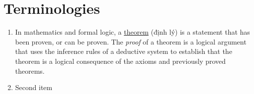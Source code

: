 \chapter{Terminologies}

\begin{enumerate}
  \item In mathematics and formal logic, a \href{https://en.wikipedia.org/wiki/Theorem}{theorem} (định lý) is a statement that has been proven, or can be proven. The \textit{proof} of a theorem is a logical argument that uses the inference rules of a deductive system to establish that the theorem is a logical consequence of the axioms and previously proved theorems.
  
  \item Second item
\end{enumerate}